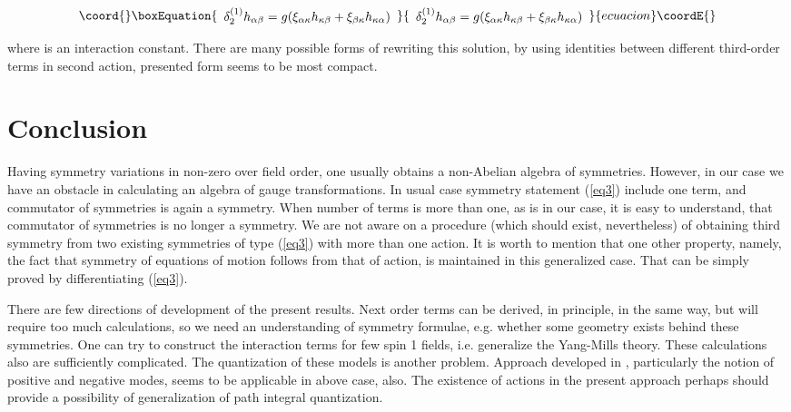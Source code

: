 \documentclass[a4paper,12pt]{article}
\begin{document}
\begin{equation}\coord{}\boxEquation{
\begin{array}{l}
\delta _2^{(1)} h_{\alpha \beta }  = g(\xi _{\alpha \kappa }
h_{\kappa \beta }  + \xi _{\beta \kappa } h_{\kappa \alpha } )
\end{array}
}{
\begin{array}{l}
\delta _2^{(1)} h_{\alpha \beta }  = g(\xi _{\alpha \kappa }
h_{\kappa \beta }  + \xi _{\beta \kappa } h_{\kappa \alpha } )
\end{array}
}{ecuacion}\coordE{}\end{equation}

where \coordHE{} is an interaction constant. There are many possible
forms of rewriting this solution, by using identities between
different third-order terms in second action, presented form seems
to be most compact.

\section{Conclusion}
Having symmetry variations in non-zero over field order, one
usually obtains a non-Abelian  algebra of symmetries. However, in
our case we have an obstacle in calculating an algebra of gauge
transformations. In usual case symmetry statement (\ref{eq3})
include one term, and commutator of symmetries is again a
symmetry. When number of terms is more than one, as is in our
case, it is easy to understand, that commutator of symmetries is
no longer a symmetry. We are not aware on a procedure (which
should exist, nevertheless) of obtaining third symmetry from two
existing symmetries of type (\ref{eq3}) with more than one action.
It is worth to mention that one other property, namely, the fact
that symmetry of equations of motion follows from that of action,
is maintained in this generalized case. That can be simply proved
by differentiating (\ref{eq3}).

There are few directions of development of the present results.
Next order terms can be derived, in principle, in the same way,
but will require too much calculations, so we need an
understanding of symmetry formulae, e.g. whether some geometry
exists behind these symmetries.  One can try to construct the
interaction terms for few spin 1 fields, i.e. generalize the
Yang-Mills theory. These calculations also are sufficiently
complicated. The quantization of these models is another problem.
Approach developed in \cite{Vas}, particularly the notion of
positive and negative modes, seems to be applicable in above case,
also. The existence of actions in the present approach perhaps
should provide a possibility of generalization of path integral
quantization.
\end{document}
